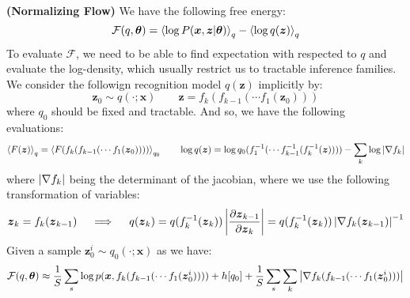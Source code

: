 \begin{definition}{\textbf{(Normalizing Flow)}}
    We have the following free energy:
    \begin{equation*}
        \mathcal{F}(q, \boldsymbol \theta) = \left\langle \log P(\boldsymbol x, \boldsymbol z | \boldsymbol \theta) \right\rangle_q - \left\langle \log q(\boldsymbol z) \right\rangle_q
    \end{equation*}
    To evaluate $\mathcal{F}$, we need to be able to find expectation with respected to $q$ and evaluate the log-density, which usually restrict us to tractable inference families. We consider the followign recognition model $q(\boldsymbol z)$ implicitly by:
    \begin{equation*}
        \boldsymbol z_0 \sim q(\cdot ; \boldsymbol x)  \qquad \boldsymbol z = f_k(f_{k-1}(\cdots f_1(\boldsymbol z_0)))
    \end{equation*}
    where $q_0$ should be fixed and tractable. And so, we have the following evaluations:
    \begin{equation*}
        \left\langle F(\boldsymbol z) \right\rangle_q = \left\langle F(f_k(f_{k-1}(\cdots f_1(\boldsymbol z_0)))) \right\rangle_{q_0} \qquad \log q(\boldsymbol z) = \log q_0(f^{-1}_1(\cdots f^{-1}_{k-1}(f^{-1}_k(\boldsymbol z)))) - \sum_k\log \left| \nabla f_k \right|
    \end{equation*}
    where $\left| \nabla f_k \right|$ being the determinant of the jacobian, where we use the following transformation of variables:
    \begin{equation*}
        \boldsymbol z_k = f_k(\boldsymbol z_{k-1}) \quad \implies \quad  q(\boldsymbol z_k) = q(f^{-1}_k(\boldsymbol z_k)) \left| \frac{\partial \boldsymbol z_{k-1}}{\partial \boldsymbol z_k} \right| = q(f^{-1}_k(\boldsymbol z_k))\left| \nabla f_k(\boldsymbol z_{k-1}) \right|^{-1}
    \end{equation*}
    Given a sample $\boldsymbol z_0^i \sim q_0(\cdot ; \boldsymbol x)$ as we have:
    \begin{equation*}
        \mathcal{F}(q, \boldsymbol \theta) \approx \frac{1}{S}\sum_s \log p(\boldsymbol x, f_k(f_{k-1}(\cdots f_1(\boldsymbol z^i_0))) ) + h[q_0] + \frac{1}{S}\sum_s\sum_k \left| \nabla f_k(f_{k-1}(\cdots f_1(\boldsymbol z^i_0))) \right|
    \end{equation*}
\end{definition}

